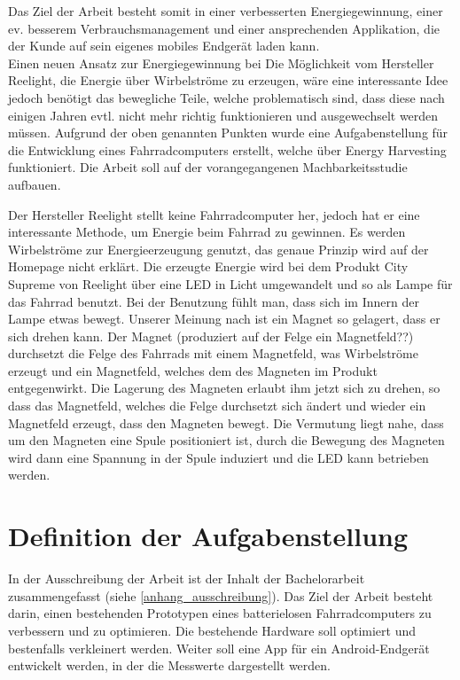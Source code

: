 
Das Ziel der Arbeit besteht somit in einer verbesserten Energiegewinnung, einer ev. besserem Verbrauchsmanagement und einer ansprechenden Applikation, die der Kunde auf sein eigenes mobiles Endgerät laden kann.\\

Einen neuen Ansatz zur Energiegewinnung bei 
Die Möglichkeit vom Hersteller Reelight, die Energie über Wirbelströme zu erzeugen, wäre eine interessante Idee jedoch benötigt das bewegliche Teile, welche problematisch sind, dass diese nach einigen Jahren evtl. nicht mehr richtig funktionieren und ausgewechselt werden müssen. Aufgrund der oben genannten Punkten wurde eine Aufgabenstellung für die Entwicklung eines Fahrradcomputers erstellt, welche über Energy Harvesting funktioniert. Die Arbeit soll auf der vorangegangenen Machbarkeitsstudie aufbauen.

Der Hersteller Reelight stellt keine Fahrradcomputer her, jedoch hat er eine interessante Methode, um Energie beim Fahrrad zu gewinnen. Es werden Wirbelströme zur Energieerzeugung genutzt, das genaue Prinzip wird auf der Homepage nicht erklärt. Die erzeugte Energie wird bei dem Produkt City Supreme von Reelight über eine LED in Licht umgewandelt und so als Lampe für das Fahrrad benutzt. Bei der Benutzung fühlt man, dass sich im Innern der Lampe etwas bewegt. Unserer Meinung nach ist ein Magnet so gelagert, dass er sich drehen kann. Der Magnet (produziert auf der Felge ein Magnetfeld??) durchsetzt die Felge des Fahrrads mit einem Magnetfeld, was Wirbelströme erzeugt und ein Magnetfeld, welches dem des Magneten im Produkt entgegenwirkt. Die Lagerung des Magneten erlaubt ihm jetzt sich zu drehen, so dass das Magnetfeld, welches die Felge durchsetzt sich ändert und wieder ein Magnetfeld erzeugt, dass den Magneten bewegt. Die Vermutung liegt nahe, dass um den Magneten eine Spule positioniert ist, durch die Bewegung des Magneten wird dann eine Spannung in der Spule induziert und die LED kann betrieben werden.\\



\section{Definition der Aufgabenstellung}
In der Ausschreibung der Arbeit ist der Inhalt der Bachelorarbeit zusammengefasst (siehe \ref{anhang_ausschreibung}). Das Ziel der Arbeit besteht darin, einen bestehenden Prototypen eines batterielosen Fahrradcomputers zu verbessern und zu optimieren. Die bestehende Hardware soll optimiert und bestenfalls verkleinert werden. Weiter soll eine App für ein Android-Endgerät entwickelt werden, in der die Messwerte dargestellt werden.


